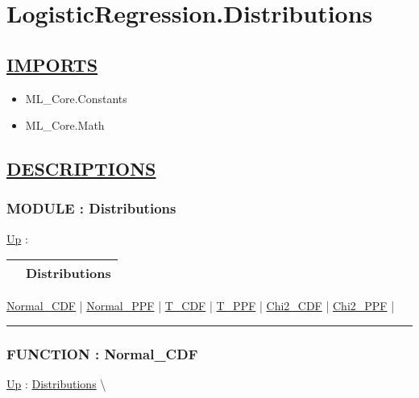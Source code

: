 \chapter*{LogisticRegression.Distributions}
\hypertarget{ecldoc:toc:LogisticRegression.Distributions}{}

\section*{\underline{IMPORTS}}
\begin{itemize}
\item ML\_Core.Constants
\item ML\_Core.Math
\end{itemize}

\section*{\underline{DESCRIPTIONS}}
\subsection*{MODULE : Distributions}
\hypertarget{ecldoc:LogisticRegression.Distributions}{}
\hyperlink{ecldoc:toc:LogisticRegression}{Up} :

{\renewcommand{\arraystretch}{1.5}
\begin{tabularx}{\textwidth}{|>{\raggedright\arraybackslash}l|X|}
\hline
\hspace{0pt} & Distributions \\
\hline
\end{tabularx}
}

\par


\hyperlink{ecldoc:logisticregression.distributions.normal_cdf}{Normal\_CDF}  |
\hyperlink{ecldoc:logisticregression.distributions.normal_ppf}{Normal\_PPF}  |
\hyperlink{ecldoc:logisticregression.distributions.t_cdf}{T\_CDF}  |
\hyperlink{ecldoc:logisticregression.distributions.t_ppf}{T\_PPF}  |
\hyperlink{ecldoc:logisticregression.distributions.chi2_cdf}{Chi2\_CDF}  |
\hyperlink{ecldoc:logisticregression.distributions.chi2_ppf}{Chi2\_PPF}  |

\rule{\linewidth}{0.5pt}

\subsection*{FUNCTION : Normal\_CDF}
\hypertarget{ecldoc:logisticregression.distributions.normal_cdf}{}
\hyperlink{ecldoc:LogisticRegression.Distributions}{Up} :
\hspace{0pt} \hyperlink{ecldoc:LogisticRegression.Distributions}{Distributions} \textbackslash 

